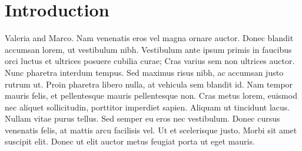 \section{Introduction}


Valeria and Marco. Nam venenatis eros vel magna ornare auctor. Donec blandit accumsan lorem, ut vestibulum nibh. Vestibulum ante ipsum primis in faucibus orci luctus et ultrices posuere cubilia curae; Cras varius sem non ultrices auctor. Nunc pharetra interdum tempus. Sed maximus risus nibh, ac accumsan justo rutrum ut. Proin pharetra libero nulla, at vehicula sem blandit id. Nam tempor mauris felis, et pellentesque mauris pellentesque non. Cras metus lorem, euismod nec aliquet sollicitudin, porttitor imperdiet sapien. Aliquam ut tincidunt lacus. Nullam vitae purus tellus. Sed semper eu eros nec vestibulum. Donec cursus venenatis felis, at mattis arcu facilisis vel. Ut et scelerisque justo. Morbi sit amet suscipit elit. Donec ut elit auctor metus feugiat porta ut eget mauris.
